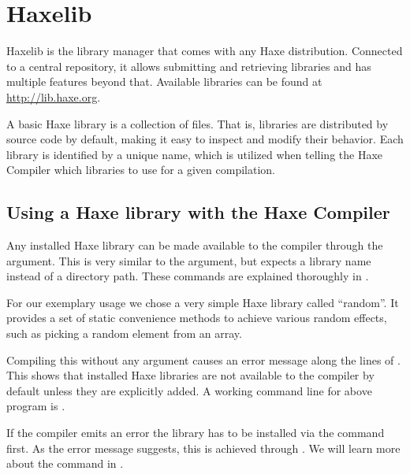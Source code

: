 \chapter{Haxelib}
\label{haxelib}

Haxelib is the library manager that comes with any Haxe distribution. Connected to a central repository, it allows submitting and retrieving libraries and has multiple features beyond that. Available libraries can be found at \url{http://lib.haxe.org}.

A basic Haxe library is a collection of  files. That is, libraries are distributed by source code by default, making it easy to inspect and modify their behavior. Each library is identified by a unique name, which is utilized when telling the Haxe Compiler which libraries to use for a given compilation.

\section{Using a Haxe library with the Haxe Compiler}
\label{haxelib-using-haxe}

Any installed Haxe library can be made available to the compiler through the  argument. This is very similar to the  argument, but expects a library name instead of a directory path. These commands are explained thoroughly in .

For our exemplary usage we chose a very simple Haxe library called ``random''. It provides a set of static convenience methods to achieve various random effects, such as picking a random element from an array.


Compiling this without any  argument causes an error message along the lines of . This shows that installed Haxe libraries are not available to the compiler by default unless they are explicitly added. A working command line for above program is .

If the compiler emits an error  the library has to be installed via the  command first. As the error message suggests, this is achieved through . We will learn more about the  command in .



